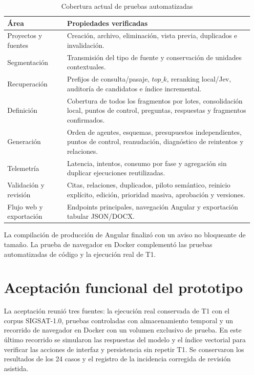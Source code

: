 \begin{table}[H]
  \centering
  \caption{Cobertura actual de pruebas automatizadas}
  \label{tab:pruebas-prototipo}
  \small
  \begin{tabularx}{\textwidth}{p{5.2cm}Y}
    \toprule
    Área & Propiedades verificadas \\
    \midrule
    Proyectos y fuentes & Creación, archivo, eliminación, vista previa, duplicados e invalidación. \\
    Segmentación & Transmisión del tipo de fuente y conservación de unidades contextuales. \\
    Recuperación & Prefijos de consulta/pasaje, \(top\_k\), reranking local/Jev, auditoría de candidatos e índice incremental. \\
    Definición & Cobertura de todos los fragmentos por lotes, consolidación local, puntos de control, preguntas, respuestas y fragmentos confirmados. \\
    Generación & Orden de agentes, esquemas, presupuestos independientes, puntos de control, reanudación, diagnóstico de reintentos y relaciones. \\
    Telemetría & Latencia, intentos, consumo por fase y agregación sin duplicar ejecuciones reutilizadas. \\
    Validación y revisión & Citas, relaciones, duplicados, piloto semántico, reinicio explícito, edición, prioridad masiva, aprobación y versiones. \\
    Flujo web y exportación & Endpoints principales, navegación Angular y exportación tabular JSON/DOCX. \\
    \bottomrule
  \end{tabularx}
\end{table}

La compilación de producción de Angular finalizó con un aviso no bloqueante de tamaño. La prueba de navegador en Docker complementó las pruebas automatizadas de código y la ejecución real de T1.

\section{Aceptación funcional del prototipo}

La aceptación reunió tres fuentes: la ejecución real conservada de T1 con el corpus SIGSAT-1.0, pruebas controladas con almacenamiento temporal y un recorrido de navegador en Docker con un volumen exclusivo de prueba. En este último recorrido se simularon las respuestas del modelo y el índice vectorial para verificar las acciones de interfaz y persistencia sin repetir T1. Se conservaron los resultados de los 24 casos y el registro de la incidencia corregida de revisión asistida.
